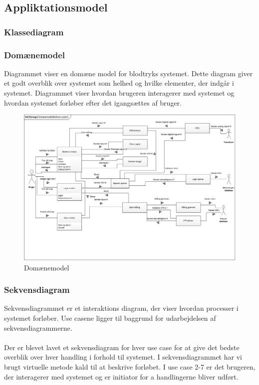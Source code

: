 \subsection{Appliktationsmodel}

\subsubsection{Klassediagram}

\subsubsection{Domænemodel}
Diagrammet viser en domæne model for blodtryks systemet. Dette diagram giver et godt overblik over systemet som helhed og hvilke elementer, der indgår i systemet. Diagrammet viser hvordan brugeren interagerer med systemet og hvordan systemet forløber efter det igangsættes af bruger. 

\begin{figure}[H]
	\centering
	\includegraphics[width=1\textwidth]{Figurer/ISE/Domaenemodel}
	\caption{Domænemodel}
	\label{domaenemodel}
\end{figure}

\subsubsection{Sekvensdiagram}
Sekvensdiagrammet er et interaktions diagram, der viser hvordan processer i systemet forløber. Use casene ligger til baggrund for udarbejdelsen af sekvensdiagrammerne.\\ \\
Der er blevet lavet et sekvensdiagram for hver use case for at give det bedste overblik over hver handling i forhold til systemet. I sekvensdiagrammet har vi brugt virtuelle metode kald til at beskrive forløbet. I use case 2-7 er det brugeren, der interagerer med systemet og er initiator for a handlingerne bliver udført.

